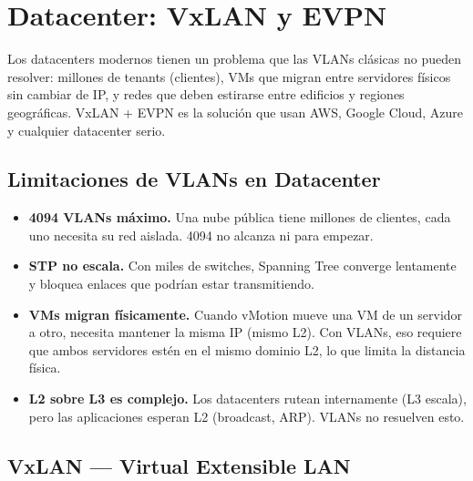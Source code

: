 
\chapter{ Datacenter: VxLAN y EVPN}

Los datacenters modernos tienen un problema que las VLANs clásicas no pueden resolver:
millones de tenants (clientes), VMs que migran entre servidores físicos sin cambiar de IP,
y redes que deben estirarse entre edificios y regiones geográficas. VxLAN + EVPN es la
solución que usan AWS, Google Cloud, Azure y cualquier datacenter serio.

\section{ Limitaciones de VLANs en Datacenter}

\begin{cuidado}
\begin{itemize}
    \item \textbf{4094 VLANs máximo.} Una nube pública tiene millones de clientes, cada
          uno necesita su red aislada. 4094 no alcanza ni para empezar.
    \item \textbf{STP no escala.} Con miles de switches, Spanning Tree converge lentamente
          y bloquea enlaces que podrían estar transmitiendo.
    \item \textbf{VMs migran físicamente.} Cuando vMotion mueve una VM de un servidor a
          otro, necesita mantener la misma IP (mismo L2). Con VLANs, eso requiere que
          ambos servidores estén en el mismo dominio L2, lo que limita la distancia física.
    \item \textbf{L2 sobre L3 es complejo.} Los datacenters rutean internamente (L3 escala),
          pero las aplicaciones esperan L2 (broadcast, ARP). VLANs no resuelven esto.
\end{itemize}
\end{cuidado}

\section{ VxLAN --- Virtual Extensible LAN}

